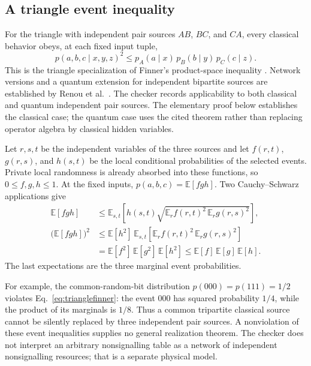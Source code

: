 \subsection{A triangle event inequality}
For the triangle with independent pair sources $AB$, $BC$, and $CA$, every
classical behavior obeys, at each fixed input tuple,
\begin{equation}
 p(a,b,c\mid x,y,z)^2\leq
 p_A(a\mid x)\,p_B(b\mid y)\,p_C(c\mid z).
 \label{eq:trianglefinner}
\end{equation}
This is the triangle specialization of Finner's product-space inequality
\cite{finner1992}. Network versions and a quantum extension for independent
bipartite sources are established by Renou et al.~\cite{renou2019limits}.
The checker records applicability to both classical and quantum independent
pair sources. The elementary proof below establishes the classical case;
the quantum case uses the cited theorem rather than replacing operator
algebra by classical hidden variables.

Let $r,s,t$ be the independent variables of the three sources and let
$f(r,t)$, $g(r,s)$, and $h(s,t)$ be the local conditional probabilities of
the selected events. Private local randomness is already absorbed into
these functions, so $0\leq f,g,h\leq1$. At the fixed inputs,
$p(a,b,c)=\mathbb E[fgh]$. Two Cauchy--Schwarz applications give
\begin{align*}
 \mathbb E[fgh]
 &\leq \mathbb E_{s,t}\!\left[h(s,t)
       \sqrt{\mathbb E_r f(r,t)^2\,\mathbb E_r g(r,s)^2}\right],\\
 \bigl(\mathbb E[fgh]\bigr)^2
 &\leq \mathbb E[h^2]\,
   \mathbb E_{s,t}\!\left[\mathbb E_r f(r,t)^2\,
                         \mathbb E_r g(r,s)^2\right]\\
 &=\mathbb E[f^2]\,\mathbb E[g^2]\,\mathbb E[h^2]
 \leq\mathbb E[f]\,\mathbb E[g]\,\mathbb E[h].
\end{align*}
The last expectations are the three marginal event probabilities.

For example, the common-random-bit distribution
$p(000)=p(111)=1/2$ violates Eq.~\eqref{eq:trianglefinner}:
the event $000$ has squared probability $1/4$, while the product of its
marginals is $1/8$. Thus a common tripartite classical source cannot be
silently replaced by three independent pair sources. A nonviolation of
these event inequalities supplies no general realization theorem. The
checker does not interpret an arbitrary nonsignalling table as a network
of independent nonsignalling resources; that is a separate physical model.

